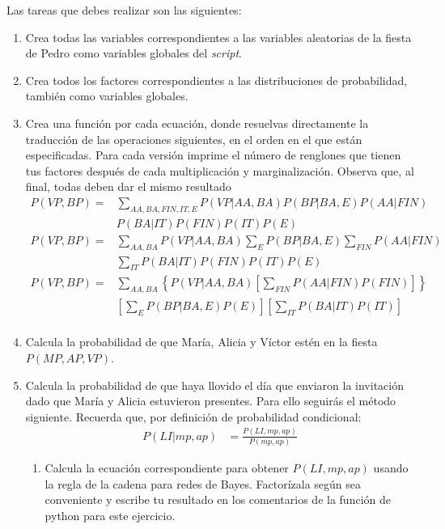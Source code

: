 Las tareas que debes realizar son las siguientes:
\begin{enumerate}
 \item Crea todas las variables correspondientes a las variables aleatorias de la fiesta de Pedro como variables globales del \textit{script}.
 
 \item Crea todos los factores correspondientes a las distribuciones de probabilidad, también como variables globales.
 
 \item Crea una función por cada ecuación, donde resuelvas directamente la traducción de las operaciones siguientes, en el orden en el que están especificadas.  Para cada versión imprime el número de renglones que tienen tus factores después de cada multiplicación y marginalización. Observa que, al final, todas deben dar el mismo resultado
 \begin{align}
  P(VP,BP) =& \sum_{AA,BA,FIN,IT,E} P(VP|AA,BA)P(BP|BA,E)P(AA|FIN) \\
            & P(BA|IT)P(FIN)P(IT)P(E) \nonumber \\
  P(VP,BP) =& \sum_{AA,BA} P(VP|AA,BA)\sum_E P(BP|BA,E)\sum_{FIN}P(AA|FIN) \\
            & \sum_{IT}P(BA|IT)P(FIN)P(IT)P(E) \nonumber \\
  P(VP,BP) =& \sum_{AA,BA} \left\lbrace P(VP|AA,BA) \left[\sum_{FIN}P(AA|FIN)P(FIN)\right] \right\rbrace \\
            & \left[\sum_E P(BP|BA,E)P(E)\right] \left[ \sum_{IT}P(BA|IT)P(IT) \right] \nonumber \\  
 \end{align}
 
 \item Calcula la probabilidad de que María, Alicia y Víctor estén en la fiesta $P(MP,AP,VP)$.
 
 \item Calcula la probabilidad de que haya llovido el día que enviaron la invitación dado que María y Alicia estuvieron presentes.  Para ello seguirás el método siguiente.
 Recuerda que, por definición de probabilidad condicional:
 \begin{align*}
   P(LI|mp,ap) &= \frac{P(LI,mp,ap)}{P(mp,ap)}
 \end{align*}
  
 \begin{enumerate}
  \item Calcula la ecuación correspondiente para obtener $P(LI,mp,ap)$ usando la regla de la cadena para redes de Bayes.  Factorízala según sea conveniente y escribe tu resultado en los comentarios de la función de python para este ejercicio.
  

\end{enumerate}
\end{enumerate}
